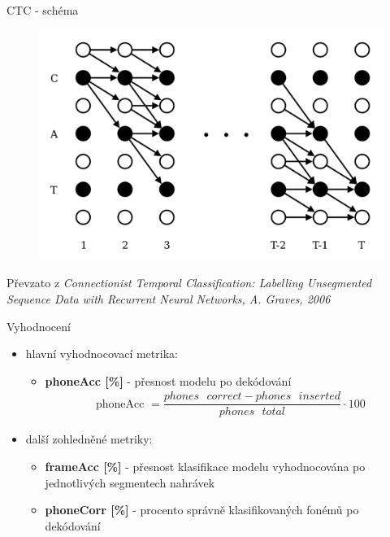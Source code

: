 \documentclass[10pt]{beamer}
\begin{document}
\begin{frame}{CTC - schéma}
	\begin{figure}
		\includegraphics[width= 0.8\linewidth]{ctc.png}
	\end{figure}
	
	\centering
	Převzato z \textit{Connectionist Temporal Classification: Labelling Unsegmented Sequence Data with Recurrent Neural Networks, A. Graves, 2006}
\end{frame}

\begin{frame}{Vyhodnocení}
	\begin{itemize}
		\item hlavní vyhodnocovací metrika:
			\begin{itemize}
				\item \textbf{phoneAcc [\%]} - přesnost modelu po dekódování
					\begin{align*}
						\text{phoneAcc } = \dfrac{phones \text{ } correct - phones \text{ } inserted}{phones \text{ } total} \cdot 100
					\end{align*}
			\end{itemize}
		\item další zohledněné metriky:
			\begin{itemize}
				\item \textbf{frameAcc [\%]} - přesnost klasifikace modelu vyhodnocována po jednotlivých segmentech nahrávek
				\item \textbf{phoneCorr [\%]} - procento správně klasifikovaných fonémů po dekódování
			\end{itemize}
	\end{itemize}
\end{frame}
\end{document}
